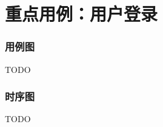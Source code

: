 \section{重点用例：用户登录}
\begin{frame}
    \frametitle{用例图}
    TODO
\end{frame}
\begin{frame}
    \frametitle{时序图}
    TODO
\end{frame}